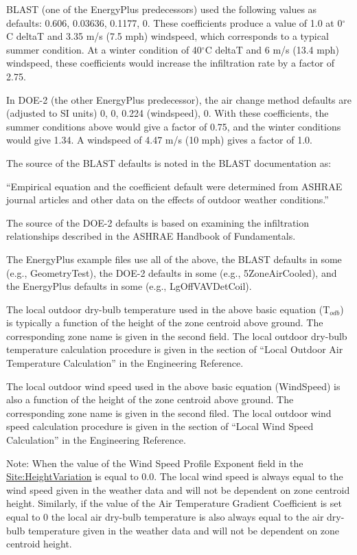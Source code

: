 BLAST (one of the EnergyPlus predecessors) used the following values as defaults: 0.606, 0.03636, 0.1177, 0. These coefficients produce a value of 1.0 at 0$^\circ$C deltaT and 3.35 m/s (7.5 mph) windspeed, which corresponds to a typical summer condition. At a winter condition of 40$^\circ$C deltaT and 6 m/s (13.4 mph) windspeed, these coefficients would increase the infiltration rate by a factor of 2.75.

In DOE-2 (the other EnergyPlus predecessor), the air change method defaults are (adjusted to SI units) 0, 0, 0.224 (windspeed), 0. With these coefficients, the summer conditions above would give a factor of 0.75, and the winter conditions would give 1.34. A windspeed of 4.47 m/s (10 mph) gives a factor of 1.0.

The source of the BLAST defaults is noted in the BLAST documentation as:

``Empirical equation and the coefficient default were determined from ASHRAE journal articles and other data on the effects of outdoor weather conditions.''

The source of the DOE-2 defaults is based on examining the infiltration relationships described in the ASHRAE Handbook of Fundamentals.

The EnergyPlus example files use all of the above, the BLAST defaults in some (e.g., GeometryTest), the DOE-2 defaults in some (e.g., 5ZoneAirCooled), and the EnergyPlus defaults in some (e.g., LgOffVAVDetCoil).

The local outdoor dry-bulb temperature used in the above basic equation (T\(_{odb}\)) is typically a function of the height of the zone centroid above ground. The corresponding zone name is given in the second field. The local outdoor dry-bulb temperature calculation procedure is given in the section of ``Local Outdoor Air Temperature Calculation'' in the Engineering Reference.

The local outdoor wind speed used in the above basic equation (WindSpeed) is also a function of the height of the zone centroid above ground. The corresponding zone name is given in the second filed. The local outdoor wind speed calculation procedure is given in the section of ``Local Wind Speed Calculation'' in the Engineering Reference.

\begin{callout}
  Note: When the value of the Wind Speed Profile Exponent field in the \hyperref[siteheightvariation]{Site:HeightVariation} is equal to 0.0. The local wind speed is always equal to the wind speed given in the weather data and will not be dependent on zone centroid height. Similarly, if the value of the Air Temperature Gradient Coefficient is set equal to 0 the local air dry-bulb temperature is also always equal to the air dry-bulb temperature given in the weather data and will not be dependent on zone centroid height.
\end{callout}

